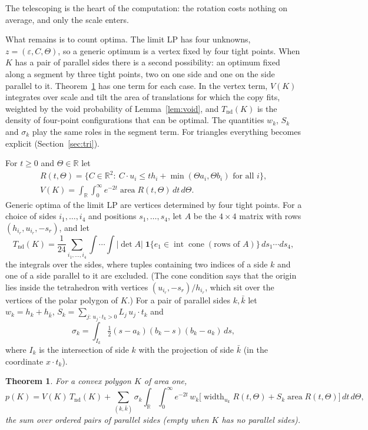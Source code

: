 \documentclass[11pt]{amsart}
\newtheorem{theorem}{Theorem}
\theoremstyle{remark}\newtheorem{remark}[theorem]{Remark}
\newcommand{\R}{\mathbb{R}}
\DeclareMathOperator{\area}{area}
\DeclareMathOperator{\width}{width}
\begin{document}
The telescoping is the heart of the computation: the rotation costs nothing on average, and only the scale enters.

What remains is to count optima. The limit LP has four unknowns, $z=(\varepsilon,C,\Theta)$, so a generic optimum is a vertex fixed by four tight points. When $K$ has a pair of parallel sides there is a second possibility: an optimum fixed along a segment by three tight points, two on one side and one on the side parallel to it. Theorem~\ref{thm:formula} has one term for each case. In the vertex term, $V(K)$ integrates over scale and tilt the area of translations for which the copy fits, weighted by the void probability of Lemma~\ref{lem:void}, and $T_{\mathrm{nd}}(K)$ is the density of four-point configurations that can be optimal. The quantities $w_k$, $S_k$ and $\sigma_k$ play the same roles in the segment term. For triangles everything becomes explicit (Section~\ref{sec:tri}).

For $t\ge0$ and $\Theta\in\R$ let
\begin{gather*}
R(t,\Theta)=\{C\in\R^2:\ C\cdot u_i\le t h_i+\min(\Theta a_i,\Theta b_i)\text{ for all }i\},\\
V(K)=\int_\R\int_0^\infty e^{-2t}\area R(t,\Theta)\,dt\,d\Theta .
\end{gather*}
Generic optima of the limit LP are vertices determined by four tight points. For a choice of sides $i_1,\dots,i_4$
and positions $s_1,\dots,s_4$, let $A$ be the $4\times4$ matrix with rows $(h_{i_r},u_{i_r},-s_r)$, and let
\[
T_{\mathrm{nd}}(K)=\frac1{24}\sum_{i_1,\dots,i_4}\int\!\!\cdots\!\!\int|\det A|\;\mathbf 1\{e_1\in\operatorname{int}
\operatorname{cone}(\text{rows of }A)\}\,ds_1\cdots ds_4 ,
\]
the integrals over the sides, where tuples containing two indices of a side $k$ and one of a side parallel to it are
excluded. (The cone condition says that the origin lies inside the tetrahedron with vertices $(u_{i_r},-s_r)/h_{i_r}$,
which sit over the vertices of the polar polygon of $K$.) For a pair of parallel sides $k,\bar k$ let
$w_k=h_k+h_{\bar k}$, $S_k=\sum_{j:\,u_j\cdot t_k>0}L_j\,u_j\cdot t_k$ and
\[
\sigma_k=\int_{I_k}\tfrac12(s-a_k)(b_k-s)(b_k-a_k)\,ds,
\]
where $I_k$ is the intersection of side $k$ with the projection of side $\bar k$ (in the coordinate $x\cdot t_k$).

\begin{theorem}\label{thm:formula}
For a convex polygon $K$ of area one,
\[
p(K)=V(K)\,T_{\mathrm{nd}}(K)+\sum_{(k,\bar k)}\sigma_k\int_\R\int_0^\infty e^{-2t}\,w_k\big[\width_{u_k}R(t,\Theta)
+S_k\area R(t,\Theta)\big]\,dt\,d\Theta,
\]
the sum over ordered pairs of parallel sides (empty when $K$ has no parallel sides).
\end{theorem}
\end{document}
